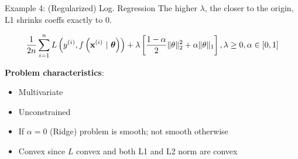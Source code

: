 \documentclass[11pt,compress,t,notes=noshow, xcolor=table]{beamer}
\begin{document}
\begin{vbframe}{Example 4: (Regularized) Log. Regression}
The higher $\lambda$, the closer to the origin, L1 shrinks coeffs exactly to 0.


\framebreak

\begin{eqnarray*}
	\frac{1}{2n} \sum\limits_{i=1}^n L\left(y^{(i)}, f\left(\mathbf{x}^{(i)} ~|~ \bm{\theta}\right)\right) + \lambda \left[\frac{1-\alpha}{2}\|\theta\|^{2}_{2} + \alpha\|\theta\|_{1}\right], \lambda \geq 0, \alpha \in [0,1]
\end{eqnarray*}

\textbf{Problem characteristics}:
\begin{itemize}
	\item Multivariate
	\item Unconstrained
	\item If $\alpha = 0$ (Ridge) problem is smooth; not smooth otherwise
	\item Convex since $L$ convex and both L1 and L2 norm are convex
\end{itemize}

\end{vbframe}
\end{document}
